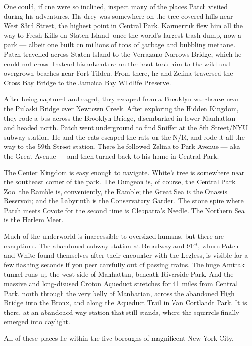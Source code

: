 \documentclass[12pt]{book}
\begin{document}
One could, if one were so inclined, inspect many of the places Patch visited during his adventures. His drey was somewhere on the tree-covered hills near West 83rd Street, the highest point in Central Park. Karmerruk flew him all the way to Fresh Kills on Staten Island, once the world's largest trash dump, now a park ---
albeit one built on millions of tons of garbage and bubbling methane. Patch travelled across Staten Island to the Verrazano Narrows Bridge, which he could not cross. Instead his adventure on the boat took him to the wild and overgrown beaches near Fort Tilden. From there, he and Zelina traversed the Cross Bay Bridge to the Jamaica Bay Wildlife Preserve.

After being captured and caged, they escaped from a Brooklyn warehouse near the Pulaski Bridge over Newtown Creek. After exploring the Hidden Kingdom, they rode a bus across the Brooklyn Bridge, disembarked in lower Manhattan, and headed north. Patch went underground to find Sniffer at the 8th Street/NYU subway station. He and the cats escaped the rats on the N/R, and rode it all the way to the 59th Street station. There he followed Zelina to Park Avenue ---
aka the Great Avenue ---
and then turned back to his home in Central Park.

The Center Kingdom is easy enough to navigate. White's tree is somewhere near the southeast corner of the park. The Dungeon is, of course, the Central Park Zoo; the Ramble is, conveniently, the Ramble; the Great Sea is the Onassis Reservoir; and the Labyrinth is the Conservatory Garden. The stone spire where Patch meets Coyote for the second time is Cleopatra's Needle. The Northern Sea is the Harlem Meer.

Much of the underworld is inaccessible to oversized humans, but there are exceptions. The abandoned subway station at Broadway and 91$^{st}$, where Patch and White found themselves after their encounter with the Legless, is visible for a few flashing seconds if you peer carefully out of passing trains. The huge Amtrak tunnel runs up the west side of Manhattan, beneath Riverside Park. And the massive and long-disused Croton Aqueduct stretches for 41 miles from Central Park, north through the very belly of Manhattan, across the abandoned High Bridge into the Bronx, and along the Aqueduct Trail in Van Cortlandt Park. It is there, at an abandoned way station that still stands, where the squirrels finally emerged into daylight.

All of these places lie within the five boroughs of magnificent New York City.

\end{document}
